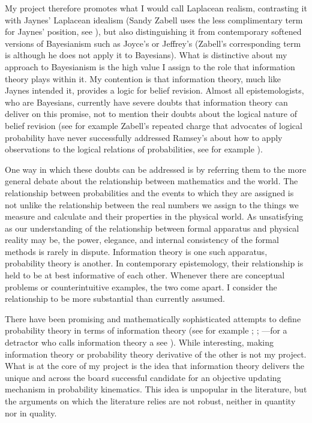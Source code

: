 \documentclass[phd,12pt,oneside]{ubcthesis}
\begin{document}
My project therefore promotes what I would call Laplacean realism,
contrasting it with Jaynes' Laplacean idealism (Sandy Zabell uses the
less complimentary term  for Jaynes'
position, see ), but also distinguishing it
from contemporary softened versions of Bayesianism such as Joyce's or
Jeffrey's (Zabell's corresponding term is 
although he does not apply it to Bayesians). What is distinctive about
my approach to Bayesianism is the high value I assign to the role that
information theory plays within it. My contention is that information
theory, much like Jaynes intended it, provides a logic for belief
revision. Almost all epistemologists, who are Bayesians, currently
have severe doubts that information theory can deliver on this
promise, not to mention their doubts about the logical nature of
belief revision (see for example Zabell's repeated charge that
advocates of logical probability have never successfully addressed
Ramsey's  about how to apply observations to
the logical relations of probabilities, see for example
).

One way in which these doubts can be addressed is by referring them to
the more general debate about the relationship between mathematics and
the world. The relationship between probabilities and the events to
which they are assigned is not unlike the relationship between the
real numbers we assign to the things we measure and calculate and
their properties in the physical world. As unsatisfying as our
understanding of the relationship between formal apparatus and
physical reality may be, the power, elegance, and internal consistency
of the formal methods is rarely in dispute. Information theory is one
such apparatus, probability theory is another. In contemporary
epistemology, their relationship is held to be at best informative of
each other. Whenever there are conceptual problems or counterintuitive
examples, the two come apart. I consider the relationship to be more
substantial than currently assumed.

There have been promising and mathematically sophisticated attempts to
define probability theory in terms of information theory (see for
example ; ;
---for a detractor who calls information theory a
 see
). While interesting, making information theory
or probability theory derivative of the other is not my project. What
is at the core of my project is the idea that information theory
delivers the unique and across the board successful candidate for an
objective updating mechanism in probability kinematics. This idea is
unpopular in the literature, but the arguments on which the literature
relies are not robust, neither in quantity nor in quality.
\end{document}

